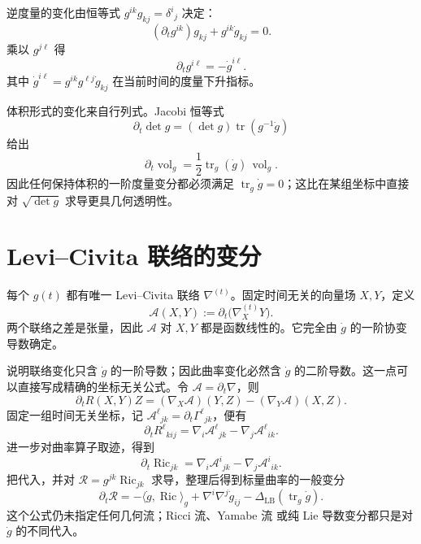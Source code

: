 逆度量的变化由恒等式 $g^{ik}g_{kj}=\delta^i{}_j$ 决定：
\[
(\partial_tg^{ik})g_{kj}+g^{ik}\dot g_{kj}=0.
\]
乘以 $g^{j\ell}$ 得
\begin{equation}\label{eq:math-dg-inverse-metric-variation}
{\partial_tg^{i\ell}=-\dot g^{i\ell}.}
\end{equation}
其中 $\dot g^{i\ell}=g^{ik}g^{\ell j}\dot g_{kj}$ 在当前时间的度量下升指标。

体积形式的变化来自行列式。Jacobi 恒等式
\[
\partial_t\det g
=(\det g)\operatorname{tr}(g^{-1}\dot g)
\]
给出
\begin{equation}\label{eq:math-dg-volume-variation}
{
\partial_t\operatorname{vol}_g
=\frac12\operatorname{tr}_g(\dot g)\,\operatorname{vol}_g.}
\end{equation}
因此任何保持体积的一阶度量变分都必须满足 $\operatorname{tr}_g \dot g=0$；这比在某组坐标中直接对 $\sqrt{\det g}$ 求导更具几何透明性。

\section{Levi--Civita 联络的变分}

每个 $g(t)$ 都有唯一 Levi--Civita 联络 $\nabla^{(t)}$。固定时间无关的向量场 $X,Y$，定义
\[
\mathcal A(X,Y)
:=\partial_t\bigl(\nabla^{(t)}_XY\bigr).
\]
两个联络之差是张量，因此 $\mathcal A$ 对 $X,Y$ 都是函数线性的。它完全由 $\dot g$ 的一阶协变导数确定。

说明联络变化只含 $\dot g$ 的一阶导数；因此曲率变化必然含 $\dot g$ 的二阶导数。这一点可以直接写成精确的坐标无关公式。令 $\mathcal A=\partial_t\nabla$，则
\begin{equation}\label{eq:math-dg-curvature-variation-abstract}
{
\partial_tR(X,Y)Z
=(\nabla_X\mathcal A)(Y,Z)
-(\nabla_Y\mathcal A)(X,Z).}
\end{equation}
固定一组时间无关坐标，记 $\mathcal A^\ell{}_{jk}=\partial_t\Gamma^\ell{}_{jk}$，便有
\[
\partial_tR^\ell{}_{kij}
=\nabla_i\mathcal A^\ell{}_{jk}
-\nabla_j\mathcal A^\ell{}_{ik}.
\]
进一步对曲率算子取迹，得到
\begin{equation}\label{eq:math-dg-ricci-variation}
\partial_t\operatorname{Ric}_{jk}
=\nabla_i\mathcal A^i{}_{jk}
-\nabla_j\mathcal A^i{}_{ik}.
\end{equation}
把代入，并对 $\mathcal R=g^{jk}\operatorname{Ric}_{jk}$ 求导，整理后得到标量曲率的一般变分
\begin{equation}\label{eq:math-dg-scalar-curvature-variation}
{
\partial_t\mathcal R
=-\langle\dot g,\operatorname{Ric}\rangle_g
+\nabla^i\nabla^j\dot g_{ij}
-\Delta_{\mathrm{LB}}(\operatorname{tr}_g\dot g).}
\end{equation}
这个公式仍未指定任何几何流；Ricci 流、Yamabe 流 或纯 Lie 导数变分都只是对 $\dot g$ 的不同代入。

